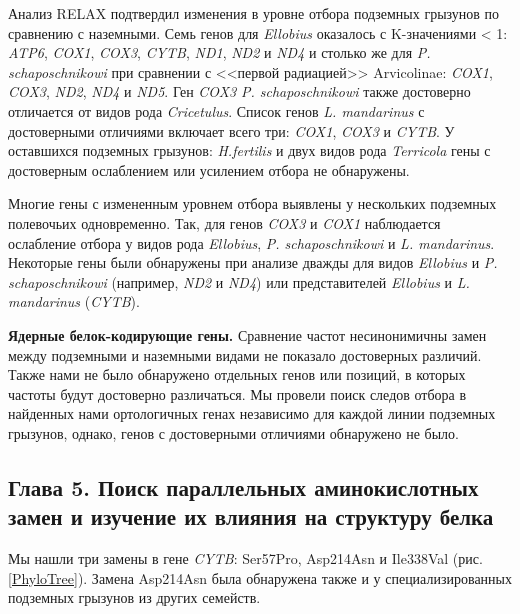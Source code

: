 Анализ RELAX подтвердил изменения в уровне отбора подземных грызунов по сравнению с наземными. Семь генов для \textit{Ellobius} оказалось с K-значениями < 1: \textit{ATP6}, \textit{COX1}, \textit{COX3}, \textit{CYTB}, \textit{ND1}, \textit{ND2} и \textit{ND4} и столько же для \textit{P. schaposchnikowi} при сравнении с <<первой радиацией>> Arvicolinae: \textit{COX1}, \textit{COX3}, \textit{ND2}, \textit{ND4} и \textit{ND5}. Ген \textit{COX3} \textit{P. schaposchnikowi} также достоверно отличается от видов рода \textit{Cricetulus}. Список генов \textit{L. mandarinus} с достоверными отличиями включает всего три: \textit{COX1}, \textit{COX3} и \textit{CYTB}. У оставшихся подземных грызунов: \textit{H.fertilis} и двух видов рода \textit{Terricola} гены с достоверным ослаблением или усилением отбора не обнаружены.

Многие гены с измененным уровнем отбора выявлены у нескольких подземных полевочьих одновременно. Так, для генов \textit{COX3} и \textit{COX1} наблюдается ослабление отбора у видов рода \textit{Ellobius}, \textit{P. schaposchnikowi} и \textit{L. mandarinus}. Некоторые гены были обнаружены при анализе дважды для видов \textit{Ellobius} и \textit{P. schaposchnikowi} (например, \textit{ND2} и \textit{ND4}) или представителей \textit{Ellobius} и \textit{L. mandarinus} (\textit{CYTB}).

\textbf{Ядерные белок-кодирующие гены.} Сравнение частот несинонимичны замен между подземными и наземными видами не показало достоверных различий. Также нами не было обнаружено отдельных генов  или позиций, в которых частоты будут достоверно различаться. Мы провели поиск следов отбора в найденных нами ортологичных генах независимо для каждой линии подземных грызунов, однако, генов с достоверными отличиями обнаружено не было. 
 
\subsection*{Глава 5. Поиск параллельных аминокислотных замен и изучение их влияния на структуру белка}

Мы нашли три замены в гене \textit{CYTB}: Ser57Pro, Asp214Asn и Ile338Val (рис. \ref{PhyloTree}). Замена Asp214Asn была обнаружена также и у специализированных подземных грызунов из других семейств.

